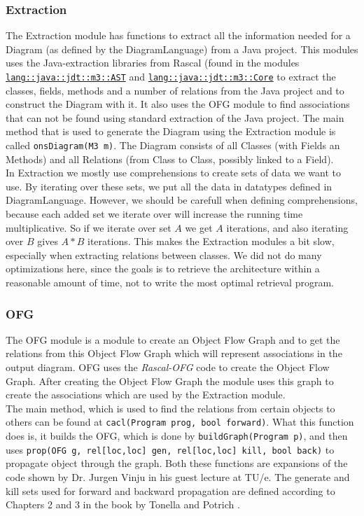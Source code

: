 \documentclass[a4paper,11pt]{article}
\begin{document}
		\subsubsection{Extraction}
			The Extraction module has functions to extract all the information needed for a Diagram (as defined by the DiagramLanguage) from a Java project. This modules uses the Java-extraction libraries from Rascal (found in the modules \texttt{\url{lang::java::jdt::m3::AST}} and \texttt{\url{lang::java::jdt::m3::Core}} to extract the classes, fields, methods and a number of relations from the Java project and to construct the Diagram with it. It also uses the OFG module to find associations that can not be found using standard extraction of the Java project. The main method that is used to generate the Diagram using the Extraction module is called \texttt{onsDiagram(M3 m)}. The Diagram consists of all Classes (with Fields an Methods) and all Relations (from Class to Class, possibly linked to a Field). \\
		
			In Extraction we mostly use comprehensions to create sets of data we want to use. By iterating over these sets, we put all the data in datatypes defined in DiagramLanguage. However, we should be carefull when defining comprehensions, because each added set we iterate over will increase the running time multiplicative. So if we iterate over set $A$ we get $A$ iterations, and also iterating over $B$ gives $A*B$ iterations. This makes the Extraction modules a bit slow, especially when extracting relations between classes. We did not do many optimizations here, since the goals is to retrieve the architecture within a reasonable amount of time, not to write the most optimal retrieval program.
	
		\subsubsection{OFG}
			The OFG module is a module to create an Object Flow Graph and to get the relations from this Object Flow Graph which will represent associations in the output diagram. OFG uses the \emph{Rascal-OFG}\cite{rascal-ofg} code to create the Object Flow Graph. After creating the Object Flow Graph the module uses this graph to create the associations which are used by the Extraction module. \\

			The main method, which is used to find the relations from certain objects to others can be found at \texttt{cacl(Program prog, bool forward)}. What this function does is, it builds the OFG, which is done by \texttt{buildGraph(Program p)}, and then uses \texttt{prop(OFG g, rel[loc,loc] gen, rel[loc,loc] kill, bool back)} to propagate object through the graph. Both these functions are expansions of the code shown by Dr. Jurgen Vinju in his guest lecture at TU/e. The generate and kill sets used for forward and backward propagation are defined according to Chapters 2 and 3 in the book by Tonella and Potrich \cite{tonella}. 
	
\end{document}
